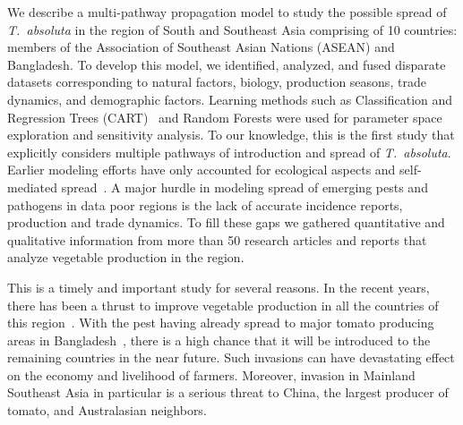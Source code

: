 \documentclass[11pt]{article}
\newcommand{\tuta}{\emph{T.~absoluta}}
\theoremstyle{definition}
\begin{document}
We describe a multi-pathway propagation model 
to study the possible spread of \tuta{} in the region of South
and Southeast Asia comprising of 10 countries: members of the Association
of Southeast Asian Nations (ASEAN) and Bangladesh. To develop this model,
we identified, analyzed, and fused disparate datasets corresponding to
natural factors, 
biology, 
production seasons, trade dynamics, 
and demographic factors. 
Learning methods such as Classification and Regression Trees
(CART)~\cite{breiman2017classification} and Random Forests were used for
parameter space exploration and sensitivity analysis.  To our knowledge,
this is the first study that explicitly considers multiple pathways of
introduction and spread of \tuta{}.  Earlier modeling efforts have only
accounted for ecological aspects and self-mediated
spread~\cite{desneux2010biological,tonnang2015identification,guimapi2016modeling}.
A major hurdle in modeling spread of emerging pests and pathogens in data
poor regions is the lack of accurate incidence reports, production and
trade dynamics. To fill these gaps we gathered quantitative and
qualitative information from more than 50 research articles and reports
that analyze vegetable production in the region.



This is a timely and important study for several reasons. In the recent
years, there has been a thrust to improve vegetable production in all the
countries of this region~\cite{ali2001}. With the pest having
already spread to major tomato producing areas in
Bangladesh~\cite{hossain2016first}, there is a high chance that it will be
introduced to the remaining countries in the near future. Such invasions
can have devastating effect on the economy and livelihood of farmers.
Moreover, invasion in Mainland Southeast Asia in particular is a serious
threat to China, the largest producer of tomato, and Australasian
neighbors.

\end{document}
